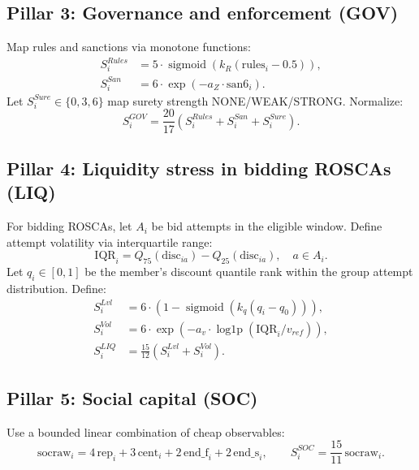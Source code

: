 \documentclass[11t]{article}
\newcommand{\sigmoid}{\operatorname{sigmoid}}
\newcommand{\logonep}{\operatorname{log1p}}
\begin{document}
\subsection{Pillar 3: Governance and enforcement (GOV)}

Map rules and sanctions via monotone functions:
\begin{align}
S^{Rules}_i &= 5\cdot \sigmoid\!\left(k_R(\text{rules}_i-0.5)\right),\\
S^{San}_i   &= 6\cdot \exp(-a_Z\cdot \text{san6}_i).
\end{align}
Let $S^{Sure}_i \in \{0,3,6\}$ map surety strength NONE/WEAK/STRONG. Normalize:
\begin{equation}
S^{GOV}_i = \frac{20}{17}\left(S^{Rules}_i+S^{San}_i+S^{Sure}_i\right).
\end{equation}

\subsection{Pillar 4: Liquidity stress in bidding ROSCAs (LIQ)}

For bidding ROSCAs, let $A_i$ be bid attempts in the eligible window. Define attempt volatility via interquartile range:
\begin{equation}
\text{IQR}_i = Q_{75}(\text{disc}_{ia}) - Q_{25}(\text{disc}_{ia}), \quad a\in A_i.
\end{equation}
Let $q_i\in[0,1]$ be the member's discount quantile rank within the group attempt distribution. Define:
\begin{align}
S^{Lvl}_i &= 6\cdot \left(1-\sigmoid\!\left(k_q(q_i-q_0)\right)\right),\\
S^{Vol}_i &= 6\cdot \exp\!\left(-a_v\cdot \logonep(\text{IQR}_i/v_{ref})\right),\\
S^{LIQ}_i &= \frac{15}{12}\left(S^{Lvl}_i+S^{Vol}_i\right).
\end{align}

\subsection{Pillar 5: Social capital (SOC)}

Use a bounded linear combination of cheap observables:
\begin{equation}
\text{socraw}_i = 4\,\text{rep}_i + 3\,\text{cent}_i + 2\,\text{end\_f}_i + 2\,\text{end\_s}_i,
\qquad
S^{SOC}_i = \frac{15}{11}\,\text{socraw}_i.
\end{equation}
\end{document}
